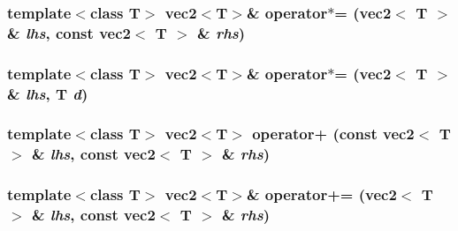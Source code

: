 \hypertarget{classnv_1_1vec2_cfb5953131392ae2ff24e5b9818e7bff}{
\subsubsection[{operator$\ast$=}]{\setlength{\rightskip}{0pt plus 5cm}template$<$class T$>$ {\bf vec2}$<$T$>$\& operator$\ast$= ({\bf vec2}$<$ T $>$ \& {\em lhs}, \/  const {\bf vec2}$<$ T $>$ \& {\em rhs})}}
\label{classnv_1_1vec2_cfb5953131392ae2ff24e5b9818e7bff}


\hypertarget{classnv_1_1vec2_216e425b7f6b4ba8fc4846b251e4fb19}{
\subsubsection[{operator$\ast$=}]{\setlength{\rightskip}{0pt plus 5cm}template$<$class T$>$ {\bf vec2}$<$T$>$\& operator$\ast$= ({\bf vec2}$<$ T $>$ \& {\em lhs}, \/  T {\em d})}}
\label{classnv_1_1vec2_216e425b7f6b4ba8fc4846b251e4fb19}


\hypertarget{classnv_1_1vec2_e9e8351f127155cf29c8afd8330b005f}{
\subsubsection[{operator+}]{\setlength{\rightskip}{0pt plus 5cm}template$<$class T$>$ {\bf vec2}$<$T$>$ operator+ (const {\bf vec2}$<$ T $>$ \& {\em lhs}, \/  const {\bf vec2}$<$ T $>$ \& {\em rhs})}}
\label{classnv_1_1vec2_e9e8351f127155cf29c8afd8330b005f}


\hypertarget{classnv_1_1vec2_3af35a75e3ae9f9dddad0fc21747b856}{
\subsubsection[{operator+=}]{\setlength{\rightskip}{0pt plus 5cm}template$<$class T$>$ {\bf vec2}$<$T$>$\& operator+= ({\bf vec2}$<$ T $>$ \& {\em lhs}, \/  const {\bf vec2}$<$ T $>$ \& {\em rhs})}}
\label{classnv_1_1vec2_3af35a75e3ae9f9dddad0fc21747b856}


